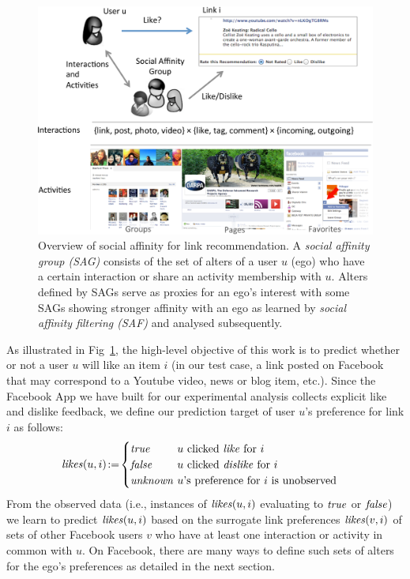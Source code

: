 
\begin{figure}[t!]
\centering
\includegraphics[width=1\linewidth]{data/overview}
\caption{Overview of social affinity for link recommendation.
A \emph{social affinity group (SAG)} consists of the set of alters 
of a user $u$ (ego) who have a
certain interaction or share an activity membership with $u$.
Alters defined by SAGs serve as proxies for an ego's interest with some
SAGs showing stronger affinity with an ego as learned by \emph{social affinity filtering (SAF)}
and analysed subsequently.}
\label{fig:overview}
\end{figure}

As illustrated in Fig~\ref{fig:overview}, the high-level objective of
this work is to predict whether or not a user $u$ will like an item
$i$ (in our test case, a link posted on Facebook that may correspond
to a Youtube video, news or blog item, etc.).  Since the Facebook App
we have built for our experimental analysis collects explicit like and
dislike feedback, we define our prediction target of user $u$'s
preference for link $i$ as follows:
\begin{align*}
\likes(u,i) & \! := \! 
          \begin{cases}
	  \true    \!\! & \!\! \text{$u$ clicked \emph{like} for $i$}\\
	  \false   \!\! & \!\! \text{$u$ clicked \emph{dislike} for $i$}\\
          \unknown \!\! & \!\! \text{$u$'s preference for $i$ is unobserved}
	  \end{cases}
\end{align*}
From the observed data (i.e., instances of $\likes(u,i)$ evaluating to
$\true$ or $\false$)
we learn to predict $\like(u,i)$ based on the surrogate link
preferences $\like(v,i)$ of sets of other Facebook users $v$ who have
at least one interaction or activity in common with $u$.  On Facebook,
there are many ways to define such sets of alters for the ego's
preferences as detailed in the next section.

